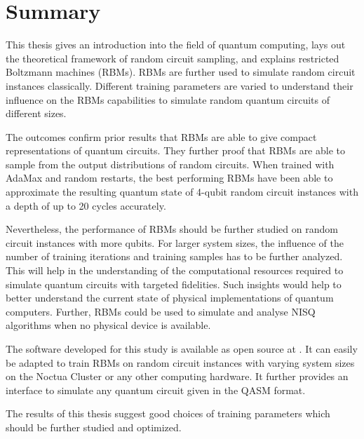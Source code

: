 \chapter{Summary}

This thesis gives an introduction into the field of quantum computing, lays out the theoretical framework 
of random circuit sampling, and explains restricted Boltzmann machines (RBMs). RBMs are further used 
to simulate random circuit instances classically. Different training parameters are varied to understand their 
influence on the RBMs capabilities to simulate random quantum circuits of different sizes. 

The outcomes confirm prior results that RBMs are able to give compact representations of quantum circuits. 
They further proof that RBMs are able to sample from the output distributions of random circuits. 
When trained with AdaMax and random restarts, the best performing RBMs
have been able to approximate the resulting quantum state of 4-qubit random circuit instances with a depth 
of up to 20 cycles accurately. 

Nevertheless, the performance of RBMs should be further studied on random circuit instances with more qubits. 
For larger system sizes, the influence of the number of training iterations and training samples has to be further 
analyzed. This will help in the understanding of the computational resources required to simulate quantum circuits 
with targeted fidelities. Such insights would help to better understand the current state of physical 
implementations of quantum computers. Further, RBMs could be used to simulate and analyse NISQ algorithms
when no physical device is available.

The software developed for this study is available as open source at \cite{NQS2020}. It can easily be adapted to 
train RBMs on random circuit instances with varying system sizes on the Noctua Cluster or any other 
computing hardware. It further provides an interface to simulate any quantum circuit given in the QASM format.

The results of this thesis suggest good choices of training parameters which should be further studied and 
optimized.
